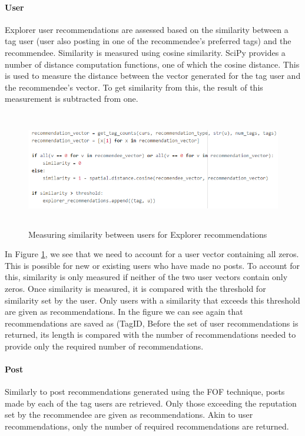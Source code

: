 \paragraph{User} Explorer user recommendations are assessed based on the similarity between a tag user (user also posting in one of the recommendee's preferred tags) and the recommendee. Similarity is measured using cosine similarity. SciPy provides a number of distance computation functions, one of which the cosine distance. This is used to measure the distance between the vector generated for the tag user and the recommendee's vector. To get similarity from this, the result of this measurement is subtracted from one.

\begin{figure}[H]
\centering
\includegraphics[height=2in]{Images/Implementation/ExplorerSimilarity}
\caption{Measuring similarity between users for Explorer recommendations}
\label{fig:ExplorerSimilarity}
\end{figure}

\noindent In Figure \ref{fig:ExplorerSimilarity}, we see that we need to account for a user vector containing all zeros. This is possible for new or existing users who have made no posts. To account for this, similarity is only measured if neither of the two user vectors contain only zeros. Once similarity is measured, it is compared with the threshold for similarity set by the user. Only users with a similarity that exceeds this threshold are given as recommendations. In the figure we can see again that recommendations are saved as (TagID, Before the set of user recommendations is returned, its length is compared with the number of recommendations needed to provide only the required number of recommendations. 

\paragraph{Post} Similarly to post recommendations generated using the FOF technique, posts made by each of the tag users are retrieved. Only those exceeding the reputation set by the recommendee are given as recommendations. Akin to user recommendations, only the number of required recommendations are returned.

